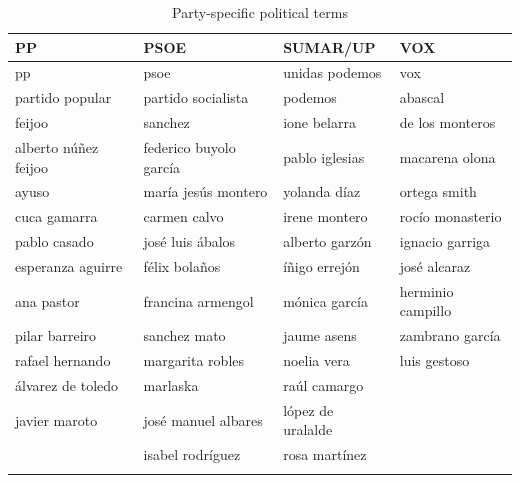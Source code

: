 \documentclass[12pt]{article}
\begin{document}
	
	
	\begin{longtable}{|l|l|l|l|}
		\hline
		\textbf{PP} & \textbf{PSOE} & \textbf{SUMAR/UP} & \textbf{VOX} \\
		\hline
		pp & psoe & unidas podemos & vox \\
		partido popular & partido socialista & podemos & abascal \\
		feijoo & sanchez & ione belarra & de los monteros \\
		alberto núñez feijoo & federico buyolo garcía & pablo iglesias & macarena olona \\
		ayuso & maría jesús montero & yolanda díaz & ortega smith \\
		cuca gamarra & carmen calvo & irene montero & rocío monasterio \\
		pablo casado & josé luis ábalos & alberto garzón & ignacio garriga \\
		esperanza aguirre & félix bolaños & íñigo errejón & josé alcaraz \\
		ana pastor & francina armengol & mónica garcía & herminio campillo \\
		pilar barreiro & sanchez mato & jaume asens & zambrano garcía \\
		rafael hernando & margarita robles & noelia vera & luis gestoso \\
		álvarez de toledo & marlaska & raúl camargo &  \\
		javier maroto & josé manuel albares & lópez de uralalde &  \\
		& isabel rodríguez & rosa martínez &  \\
		\hline
		\caption{Party-specific political terms}
		\label{table:party_terms}
	\end{longtable}
	
\end{document}
